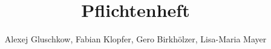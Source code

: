 \title{Pflichtenheft}
\author{Alexej Gluschkow, Fabian Klopfer, Gero Birkhölzer, Lisa-Maria Mayer}
\maketitle
